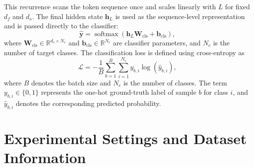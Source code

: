 \documentclass{ieeeaccess}
\begin{document}
This recurrence scans the token sequence once and scales linearly with $L$ for fixed $d_f$ and $d_s$. The final hidden state $\mathbf{h}_{L}$ is used as the sequence-level representation and is passed directly to the classifier:
\begin{equation}
\widehat{\mathbf{y}}
=
\operatorname{softmax}
\left(
\mathbf{h}_{L}\mathbf{W}_{\mathrm{cls}}
+
\mathbf{b}_{\mathrm{cls}}
\right),
\label{eq:ssm_softmax}
\end{equation}
where $\mathbf{W}_{\mathrm{cls}}\in\mathbb{R}^{d_s\times N_c}$ and
$\mathbf{b}_{\mathrm{cls}}\in\mathbb{R}^{N_c}$ are classifier parameters, and $N_c$ is the number of target classes. The classification loss is defined using cross-entropy as
\begin{equation}
\mathcal{L}
=
-\frac{1}{B}
\sum_{b=1}^{B}
\sum_{i=1}^{N_c}
y_{b,i}
\log
\left(
\widehat{y}_{b,i}
\right),
\label{eq:ce_loss}
\end{equation}
where $B$ denotes the batch size and $N_c$ is the number of classes. The term $y_{b,i}\in\{0,1\}$ represents the one-hot ground-truth label of sample $b$ for class $i$, and $\widehat{y}_{b,i}$ denotes the corresponding predicted probability.




\section{Experimental Settings and Dataset Information}
\label{sec:experiments}
\end{document}
